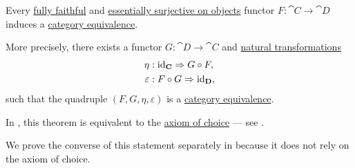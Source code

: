 \begin{theorem}\label{thm:fully_faithful_and_essentially_surjective_functor_induces_equivalence}
  Every \hyperref[def:functor_invertibility/fully_faithful]{fully faithful} and \hyperref[def:functor_invertibility/surjective_on_objects]{essentially surjective on objects} functor \( F: \cat{C} \to \cat{D} \) induces a \hyperref[def:category_equivalence]{category equivalence}.

  More precisely, there exists a functor \( G: \cat{D} \to \cat{C} \) and \hyperref[def:natural_transformation]{natural transformations}
  \begin{align*}
    \eta        &: \id_{\cat{C}} \Rightarrow G \bincirc F, \\
    \varepsilon &: F \bincirc G \Rightarrow \id_{\cat{D}},
  \end{align*}
  such that the quadruple \( (F, G, \eta, \varepsilon) \) is a \hyperref[def:category_equivalence]{category equivalence}.

  In \hyperref[def:zfc]{}, this theorem is equivalent to the \hyperref[def:zfc/choice]{axiom of choice} --- see .

  We prove the converse of this statement separately in  because it does not rely on the axiom of choice.
\end{theorem}
